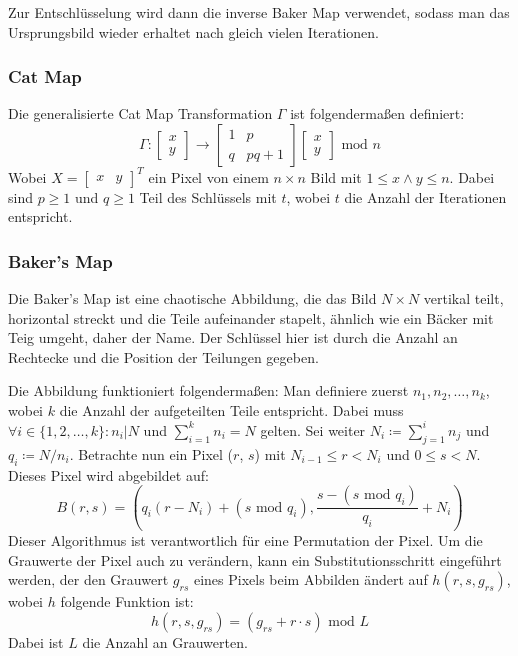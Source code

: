 Zur Entschlüsselung wird dann die inverse Baker Map verwendet, sodass man das Ursprungsbild wieder erhaltet nach gleich vielen Iterationen.

\subsubsection{Cat Map}
Die generalisierte Cat Map Transformation $\Gamma$ ist folgendermaßen definiert:
$$
	\Gamma:
	\begin{bmatrix} x \\ y \end{bmatrix} \rightarrow
	\begin{bmatrix} 1 & p \\ q & pq + 1 \end{bmatrix}
	\begin{bmatrix} x \\ y \end{bmatrix} \text{ mod } n
$$
Wobei $X = \begin{bmatrix} x & y \end{bmatrix}^T$ ein Pixel von einem $n \times n$ Bild mit $1 \leq x \land y \leq n$.
Dabei sind $p \geq 1$ und $q \geq 1$ Teil des Schlüssels mit $t$, wobei $t$ die Anzahl der Iterationen entspricht. \cite{chaos}

\subsubsection{Baker's Map}\label{sec:bakersmap}
Die Baker's Map ist eine chaotische Abbildung, die das Bild $N \times N$ vertikal teilt, horizontal streckt und die Teile aufeinander stapelt, ähnlich
wie ein Bäcker mit Teig umgeht, daher der Name. Der Schlüssel hier ist durch die Anzahl an Rechtecke und die Position der Teilungen gegeben. \cite{chaos}

Die Abbildung funktioniert folgendermaßen: Man definiere zuerst $n_1, n_2, \dots , n_k$, wobei $k$ die Anzahl der aufgeteilten Teile entspricht.
Dabei muss $\forall i \in \{1, 2, \dots, k\} : n_i | N$ und $\sum_{i = 1}^{k} n_i = N$ gelten. Sei weiter $N_i \coloneq \sum_{j = 1}^{i} n_j$ und $q_i \coloneq N/n_i$.
Betrachte nun ein Pixel ($r$, $s$) mit $N_{i - 1} \leq r < N_i$ und $0 \leq s < N$. Dieses Pixel wird abgebildet auf: \cite{fridrich97}
$$B(r, s) =  (q_i(r - N_i) + (s \text{ mod } q_i), \frac{s - (s \text{ mod } q_i)}{q_i} + N_i)$$
Dieser Algorithmus ist verantwortlich für eine Permutation der Pixel. Um die Grauwerte der Pixel auch zu verändern, kann ein Substitutionsschritt
eingeführt werden, der den Grauwert $g_{rs}$ eines Pixels beim Abbilden ändert auf $h(r, s, g_{rs})$, wobei $h$ folgende Funktion ist:
$$h(r, s, g_{rs}) = (g_{rs} + r \cdot s) \text{ mod } L$$
Dabei ist $L$ die Anzahl an Grauwerten.
\cite{chaos}

